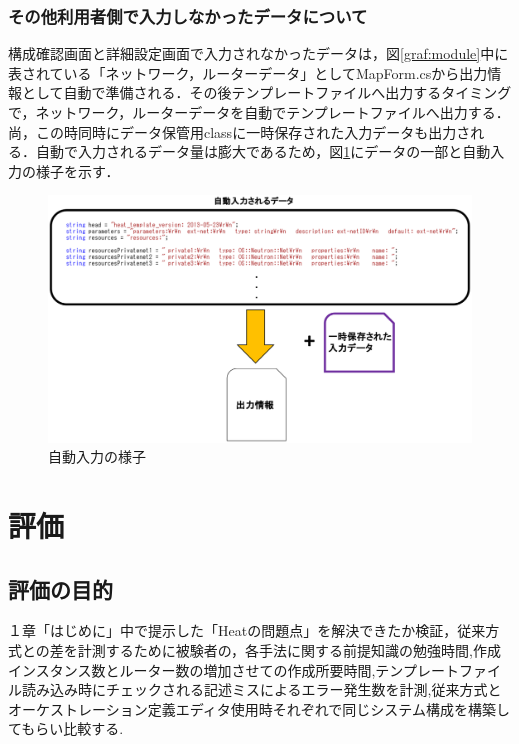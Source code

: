 \documentclass[mingoth]{kut-paper}		%
\begin{document}
		\subsection{その他利用者側で入力しなかったデータについて}
		構成確認画面と詳細設定画面で入力されなかったデータは，図\ref{graf:module}中に表されている「ネットワーク，ルーターデータ」としてMapForm.csから出力情報として自動で準備される．その後テンプレートファイルへ出力するタイミングで，ネットワーク，ルーターデータを自動でテンプレートファイルへ出力する．尚，この時同時にデータ保管用classに一時保存された入力データも出力される．自動で入力されるデータ量は膨大であるため，図\ref{graf:auto}にデータの一部と自動入力の様子を示す．
			\begin{figure}[H]
				\begin{center}
					\includegraphics[scale=0.42]{Document/自動入力の様子.eps}
					\caption{自動入力の様子}
					\label{graf:auto}
				\end{center}
			\end{figure}
		
\chapter{評価}
	\section{評価の目的}
	１章「はじめに」中で提示した「Heatの問題点」を解決できたか検証，従来方式との差を計測するために被験者の，各手法に関する前提知識の勉強時間,作成インスタンス数とルーター数の増加させての作成所要時間,テンプレートファイル読み込み時にチェックされる記述ミスによるエラー発生数を計測,従来方式とオーケストレーション定義エディタ使用時それぞれで同じシステム構成を構築してもらい比較する.
\end{document}
